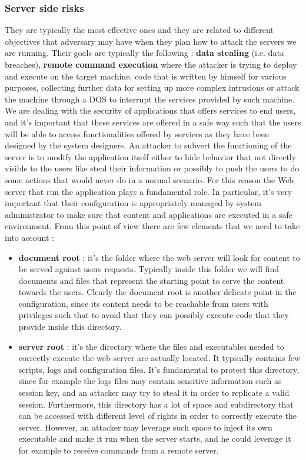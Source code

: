 \subsubsection{Server side risks}
They are typically the most effective ones and they are related to different objectives that adversary may have when they plan how to attack the servers we are running. Their goals are typically the following : \textbf{data stealing} (i.e. data breaches), \textbf{remote command execution} where the attacker is trying to deploy and execute on the target machine, code that is written by himself for various purposes, collecting further data for setting up more complex intrusions or attack the machine through a DOS to interrupt the services provided by such machine. We are dealing with the security of applications that offers services to end users, and it's important that these services are offered in a safe way such that the users will be able to access functionalities offered by services as they have been designed by the system designers. An attacker to subvert the functioning of the server is to modify the application itself either to hide behavior that not directly visible to the users like steal their information or possibly to push the users to do some actions that would never do in a normal scenario. For this reason the Web server that run the application plays a fundamental role. In particular, it's very important that their configuration is appropriately managed by system administrator to make sure that content and applications are executed in a safe environment. From this point of view there are few elements that we need to take into account :
\begin{itemize}
\item \textbf{document root} : it's the folder where the web server will look for content to be served against users requests. Typically inside this folder we will find documents and files that represent the starting point to serve the content towards the users. Clearly the document root is another delicate point in the configuration, since its content needs to be reachable from users with privileges such that to avoid that they can possibly execute code that they provide inside this directory.
\item \textbf{server root} : it's the directory where the files and executables needed to correctly execute the web server are actually located. It typically contains few scripts, logs and configuration files. It's fundamental to protect this directory, since for example the logs files may contain sensitive information such as session key, and an attacker may try to steal it in order to replicate a valid session. Furthermore, this directory has a lot of space and subdirectory that can be accessed with different level of rights in order to correctly execute the server. However, an attacker may leverage such space to inject its own executable and make it run when the server starts, and he could leverage it for example to receive commands from a remote server. 
\end{itemize}

